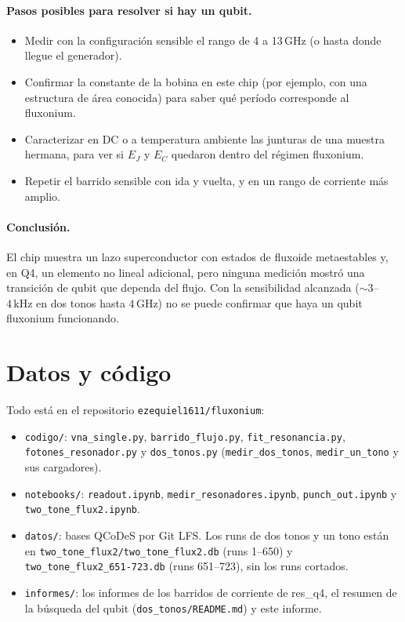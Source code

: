 \documentclass[11pt,a4paper]{article}
\newcommand{\GHz}{\,\mathrm{GHz}}
\newcommand{\kHz}{\,\mathrm{kHz}}
\begin{document}
\paragraph{Pasos posibles para resolver si hay un qubit.}
\begin{itemize}
  \item Medir con la configuración sensible el rango de 4 a 13\,GHz (o hasta donde llegue el generador).
  \item Confirmar la constante de la bobina en este chip (por ejemplo, con una estructura de área conocida) para
    saber qué período corresponde al fluxonium.
  \item Caracterizar en DC o a temperatura ambiente las junturas de una muestra hermana, para ver si $E_J$ y $E_C$
    quedaron dentro del régimen fluxonium.
  \item Repetir el barrido sensible con ida y vuelta, y en un rango de corriente más amplio.
\end{itemize}

\paragraph{Conclusión.} El chip muestra un lazo superconductor con estados de fluxoide metaestables y, en Q4, un
elemento no lineal adicional, pero ninguna medición mostró una transición de qubit que dependa del flujo. Con la
sensibilidad alcanzada ($\sim 3$--$4\kHz$ en dos tonos hasta $4\GHz$) no se puede confirmar que haya un qubit
fluxonium funcionando.

\appendix
\section{Datos y código}

Todo está en el repositorio \texttt{ezequiel1611/fluxonium}:
\begin{itemize}
  \item \texttt{codigo/}: \texttt{vna\_single.py}, \texttt{barrido\_flujo.py}, \texttt{fit\_resonancia.py},
    \texttt{fotones\_resonador.py} y \texttt{dos\_tonos.py} (\texttt{medir\_dos\_tonos}, \texttt{medir\_un\_tono} y
    sus cargadores).
  \item \texttt{notebooks/}: \texttt{readout.ipynb}, \texttt{medir\_resonadores.ipynb}, \texttt{punch\_out.ipynb} y
    \texttt{two\_tone\_flux2.ipynb}.
  \item \texttt{datos/}: bases QCoDeS por Git LFS. Los runs de dos tonos y un tono están en
    \texttt{two\_tone\_flux2/two\_tone\_flux2.db} (runs 1--650) y \texttt{two\_tone\_flux2\_651-723.db} (runs 651--723),
    sin los runs cortados.
  \item \texttt{informes/}: los informes de los barridos de corriente de res\_q4, el resumen de la búsqueda del qubit
    (\texttt{dos\_tonos/README.md}) y este informe.
\end{itemize}
\end{document}
